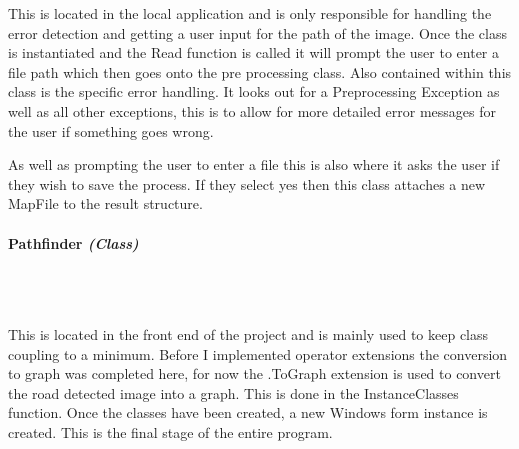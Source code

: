 \begin{FlushLeft}
    This is located in the local application and is only responsible for handling the error detection and getting a user input for the path of the image. Once the class is instantiated and the Read function is called it will prompt the user to enter a file path which then goes onto the pre processing class. Also contained within this class is the specific error handling. It looks out for a Preprocessing Exception as well as all other exceptions, this is to allow for more detailed error messages for the user if something goes wrong.\\\bk

    As well as prompting the user to enter a file this is also where it asks the user if they wish to save the process. If they select yes then this class attaches a new MapFile to the result structure. \\
    \bk

    \pagebreak
\paragraph{Pathfinder \textit{(Class)}} \mbox{} \\

    \begin{figure}[H]
        \centering
    \end{figure}\\

    This is located in the front end of the project and is mainly used to keep class coupling to a minimum. Before I implemented operator extensions the conversion to graph was completed here, for now the .ToGraph extension is used to convert the road detected image into a graph. This is done in the InstanceClasses function. Once the classes have been created, a new Windows form instance is created. This is the final stage of the entire program. \\

    \bk


\end{FlushLeft}

